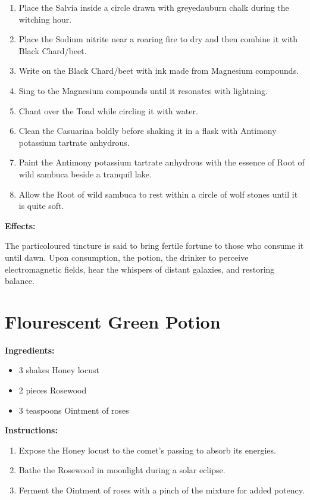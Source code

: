 \documentclass{article}
\begin{document}
\begin{enumerate}
  \item Place the Salvia inside a circle drawn with greyedauburn chalk during the witching hour.
  \item Place the Sodium nitrite near a roaring fire to dry and then combine it with Black Chard/beet.
  \item Write on the Black Chard/beet with ink made from Magnesium compounds.
  \item Sing to the Magnesium compounds until it resonates with lightning.
  \item Chant over the Toad while circling it with water.
  \item Clean the Casuarina boldly before shaking it in a flask with Antimony potassium tartrate anhydrous.
  \item Paint the Antimony potassium tartrate anhydrous with the essence of Root of wild sambuca beside a tranquil lake.
  \item Allow the Root of wild sambuca to rest within a circle of wolf stones until it is quite soft.
\end{enumerate}

\textbf{Effects:}

The particoloured tincture is said to bring fertile fortune to those who consume it until dawn. Upon consumption, the potion, the drinker to perceive electromagnetic fields, hear the whispers of distant galaxies, and restoring balance.

\newpage
\section*{Flourescent Green Potion}

\textbf{Ingredients:}

\begin{itemize}
  \item 3 shakes Honey locust
  \item 2 pieces Rosewood
  \item 3 teaspoons Ointment of roses
\end{itemize}

\textbf{Instructions:}

\begin{enumerate}
  \item Expose the Honey locust to the comet’s passing to absorb its energies.
  \item Bathe the Rosewood in moonlight during a solar eclipse.
  \item Ferment the Ointment of roses with a pinch of the mixture for added potency.
\end{enumerate}
\end{document}
